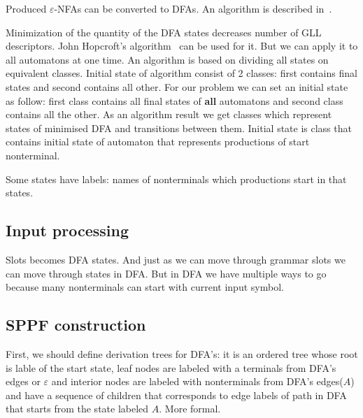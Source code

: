 \documentclass[runningheads,a4paper]{llncs}
\begin{document}
Produced $\varepsilon$-NFAs can be converted to DFAs. An algorithm is described in~\cite{aho1974design}.

Minimization of the quantity of the DFA states decreases number of GLL descriptors. John Hopcroft's 
algorithm~\cite{hopcroft1971n} can be used for it. But we can apply it to all automatons at one time. 
An algorithm is based on dividing all states on equivalent classes. Initial state of algorithm consist 
of 2 classes: first contains final states and second contains all other. For our problem we can set an 
initial state as follow: first class contains all final states of \textbf{all} automatons and second class 
contains all the other. As an algorithm result we get classes which represent states of minimised DFA and 
transitions between them.
Initial state is class that contains initial state of automaton that represents productions of start nonterminal.

Some states have labels: names of nonterminals which productions start in that states.


\subsection{Input processing}%

Slots becomes DFA states. And just as we can move through grammar slots we can move through states 
in DFA. But in DFA we have multiple ways to go because many nonterminals can start with current input symbol. 








\subsection{SPPF construction}

First, we should define derivation trees for DFA's: it is an ordered tree whose root is lable of the start state,
leaf nodes are labeled with a terminals from DFA's edges or $\varepsilon$ and interior nodes are labeled with 
nonterminals from DFA's edges($ A $) and have a sequence of children that corresponds to edge labels of path in 
DFA that starts from the state labeled $ A $. More formal. 
\end{document}
